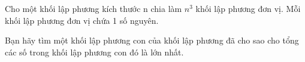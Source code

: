 Cho một khối lập phương kích thước n chia làm $n^{3}$ khối lập phương đơn vị. Mỗi khối lập phương đơn vị chứa 1 số nguyên.


Bạn hãy tìm một khối lập phương con của khối lập phương đã cho sao cho tổng các số trong khối lập phương con đó là lớn nhất.
